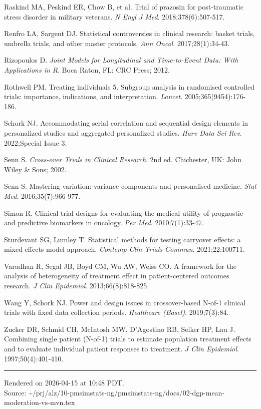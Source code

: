 \documentclass[11pt]{article}
\begin{document}
Raskind MA, Peskind ER, Chow B, et al. Trial of prazosin for
post-traumatic stress disorder in military veterans.
\textit{N Engl J Med}. 2018;378(6):507-517.

Renfro LA, Sargent DJ. Statistical controversies in clinical
research: basket trials, umbrella trials, and other master
protocols. \textit{Ann Oncol}. 2017;28(1):34-43.

Rizopoulos D. \textit{Joint Models for Longitudinal and
Time-to-Event Data: With Applications in R}. Boca Raton, FL:
CRC Press; 2012.

Rothwell PM. Treating individuals 5. Subgroup analysis in
randomised controlled trials: importance, indications, and
interpretation. \textit{Lancet}. 2005;365(9454):176-186.

Schork NJ. Accommodating serial correlation and sequential
design elements in personalized studies and aggregated
personalized studies. \textit{Harv Data Sci Rev}. 2022;Special
Issue 3.

Senn S. \textit{Cross-over Trials in Clinical Research}. 2nd ed.
Chichester, UK: John Wiley \& Sons; 2002.

Senn S. Mastering variation: variance components and
personalised medicine. \textit{Stat Med}. 2016;35(7):966-977.

Simon R. Clinical trial designs for evaluating the medical
utility of prognostic and predictive biomarkers in oncology.
\textit{Per Med}. 2010;7(1):33-47.

Sturdevant SG, Lumley T. Statistical methods for testing
carryover effects: a mixed effects model approach.
\textit{Contemp Clin Trials Commun}. 2021;22:100711.

Varadhan R, Segal JB, Boyd CM, Wu AW, Weiss CO. A framework for
the analysis of heterogeneity of treatment effect in
patient-centered outcomes research. \textit{J Clin Epidemiol}.
2013;66(8):818-825.

Wang Y, Schork NJ. Power and design issues in crossover-based
N-of-1 clinical trials with fixed data collection periods.
\textit{Healthcare (Basel)}. 2019;7(3):84.

Zucker DR, Schmid CH, McIntosh MW, D'Agostino RB, Selker HP,
Lau J. Combining single patient (N-of-1) trials to estimate
population treatment effects and to evaluate individual patient
responses to treatment. \textit{J Clin Epidemiol}. 1997;50(4):401-410.

\vfill
\noindent\rule{\textwidth}{0.4pt}
{\footnotesize
Rendered on 2026-04-15 at 10:48 PDT.\\
Source: \textasciitilde/prj/alz/10-pmsimstats-ng/pmsimstats-ng/docs/02-dgp-mean-moderation-vs-mvn.tex}
\end{document}
